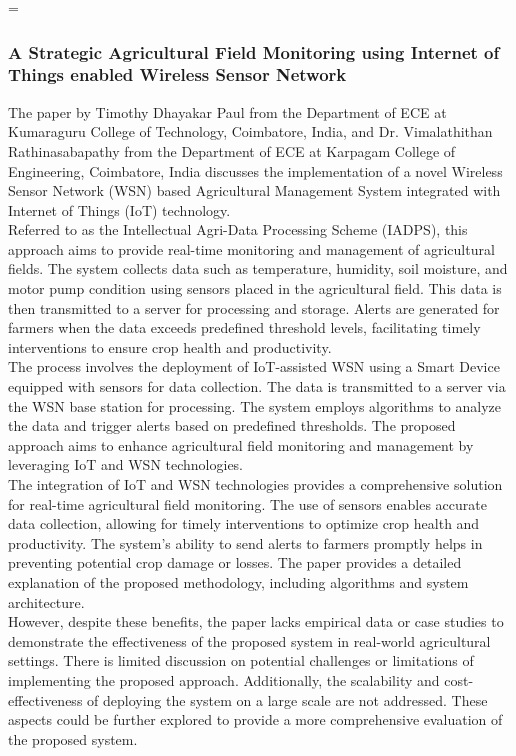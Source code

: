 =\documentclass[12pt, a4paper]{article}
\begin{document}
\subsubsection{A Strategic Agricultural Field Monitoring using Internet of Things enabled Wireless Sensor Network}
The paper by Timothy Dhayakar Paul from the Department of ECE at Kumaraguru College of Technology, Coimbatore, India, and Dr. Vimalathithan Rathinasabapathy from the Department of ECE at Karpagam College of Engineering, Coimbatore, India \cite{paul2021strategic} discusses the implementation of a novel Wireless Sensor Network (WSN) based Agricultural Management System integrated with Internet of Things (IoT) technology.\\
Referred to as the Intellectual Agri-Data Processing Scheme (IADPS), this approach aims to provide real-time monitoring and management of agricultural fields. The system collects data such as temperature, humidity, soil moisture, and motor pump condition using sensors placed in the agricultural field. This data is then transmitted to a server for processing and storage. Alerts are generated for farmers when the data exceeds predefined threshold levels, facilitating timely interventions to ensure crop health and productivity.\\
The process involves the deployment of IoT-assisted WSN using a Smart Device equipped with sensors for data collection. The data is transmitted to a server via the WSN base station for processing. The system employs algorithms to analyze the data and trigger alerts based on predefined thresholds. The proposed approach aims to enhance agricultural field monitoring and management by leveraging IoT and WSN technologies.\\
The integration of IoT and WSN technologies provides a comprehensive solution for real-time agricultural field monitoring. The use of sensors enables accurate data collection, allowing for timely interventions to optimize crop health and productivity. The system's ability to send alerts to farmers promptly helps in preventing potential crop damage or losses. The paper provides a detailed explanation of the proposed methodology, including algorithms and system architecture.\\
However, despite these benefits, the paper lacks empirical data or case studies to demonstrate the effectiveness of the proposed system in real-world agricultural settings. There is limited discussion on potential challenges or limitations of implementing the proposed approach. Additionally, the scalability and cost-effectiveness of deploying the system on a large scale are not addressed. These aspects could be further explored to provide a more comprehensive evaluation of the proposed system. 
\end{document}
